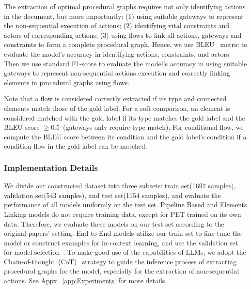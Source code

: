 
The extraction of optimal procedural graphs requires not only identifying actions in the document, but more importantly: (1) using suitable gateways to represent the non-sequential execution of actions; (2) identifying vital constraints and actors of corresponding actions; (3) using flows to link all actions, gateways and constraints to form a complete procedural graph. 
Hence, we use BLEU~\cite{papineni2002bleu} metric to evaluate the model's accuracy in identifying actions, constraints, and actors. 
Then we use standard F1-score to evaluate the model's accuracy in using suitable gateways to represent non-sequential actions execution and correctly linking elements in procedural graphs using flows. 

Note that a flow is considered correctly extracted if its type and connected elements match those of the gold label. For a soft comparison, an element is considered matched with the gold label if its type matches the gold label and the BLEU score $\geq 0.5$~(gateways only require type match). 
For conditional flow, we compute the BLEU score between its condition and the gold label's condition if a condition flow in the gold label can be matched. 

\subsubsection{Implementation Details}
We divide our constructed dataset into three subsets: train set(1697 samples), validation set(543 samples), and test set(1154 samples), and evaluate the performance of all models uniformly on the test set. Pipeline Based and Elements Linking models do not require training data, except for PET trained on its own data. Therefore, we evaluate these models on our test set according to the original papers' setting. 
End to End models utilize our train set to fine-tune the model or construct examples for in-context learning, and use the validation set for model selection~\cite{raschka2018model}. 
To make good use of the capabilities of LLMs, we adopt the Chain-of-thought~(CoT)~\cite{wei2022chain} strategy to guide the inference process of extracting procedural graphs for the model, especially for the extraction of non-sequential actions. See Appx.~\ref{app:Experiments} for more details. 

